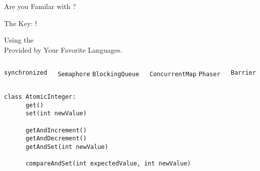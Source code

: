 \begin{frame}{}
\end{frame}

\begin{frame}{}
  {\vspace{0.30cm}\centerline{\Large Are you Familar with ?}}
\end{frame}

\begin{frame}{}
    {\vspace{0.30cm}\centerline{\Large The Key: !}}
\end{frame}

\begin{frame}{}

  \begin{center}
    {\Large Using the  \\ Provided by Your Favorite Languages.}
  \end{center}
\end{frame}

\begin{frame}[fragile]{}

  \begin{columns}
      \texttt{\qquad synchronized}

      \texttt{\qquad Semaphore}
      \texttt{\quad BlockingQueue}
      
      \texttt{\quad ConcurrentMap}
      \texttt{\qquad Phaser}

      \texttt{\qquad Barrier}
  \end{columns}

  \vspace{0.80cm}
  \pause
  \begin{lstlisting}[style = Cstyle]
    class AtomicInteger:
      get()
      set(int newValue)

      getAndIncrement()
      getAndDecrement()
      getAndSet(int newValue)

      compareAndSet(int expectedValue, int newValue)
  \end{lstlisting}
\end{frame}

